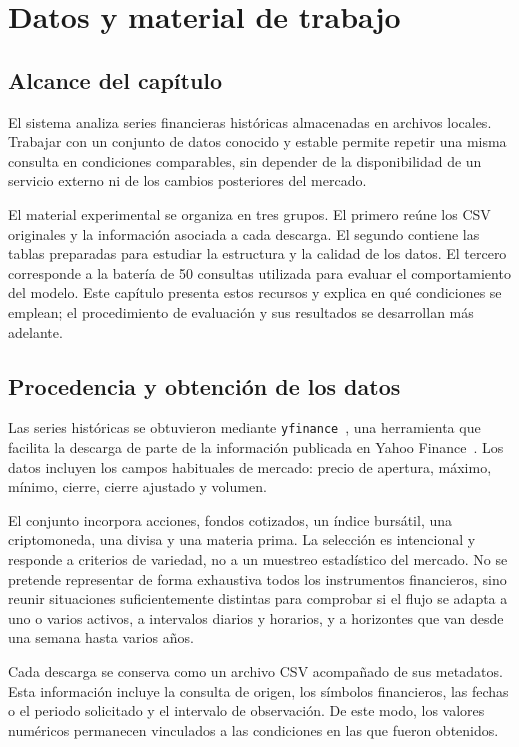 \chapter{Datos y material de trabajo}

\section{Alcance del capítulo}

El sistema analiza series financieras históricas almacenadas en archivos locales. Trabajar con un conjunto de datos conocido y estable permite repetir una misma consulta en condiciones comparables, sin depender de la disponibilidad de un servicio externo ni de los cambios posteriores del mercado.

El material experimental se organiza en tres grupos. El primero reúne los CSV originales y la información asociada a cada descarga. El segundo contiene las tablas preparadas para estudiar la estructura y la calidad de los datos. El tercero corresponde a la batería de 50 consultas utilizada para evaluar el comportamiento del modelo. Este capítulo presenta estos recursos y explica en qué condiciones se emplean; el procedimiento de evaluación y sus resultados se desarrollan más adelante.

\section{Procedencia y obtención de los datos}

Las series históricas se obtuvieron mediante \texttt{yfinance}~\cite{yfinance}, una herramienta que facilita la descarga de parte de la información publicada en Yahoo Finance~\cite{yahoofinancehistorical}. Los datos incluyen los campos habituales de mercado: precio de apertura, máximo, mínimo, cierre, cierre ajustado y volumen.

El conjunto incorpora acciones, fondos cotizados, un índice bursátil, una criptomoneda, una divisa y una materia prima. La selección es intencional y responde a criterios de variedad, no a un muestreo estadístico del mercado. No se pretende representar de forma exhaustiva todos los instrumentos financieros, sino reunir situaciones suficientemente distintas para comprobar si el flujo se adapta a uno o varios activos, a intervalos diarios y horarios, y a horizontes que van desde una semana hasta varios años.

Cada descarga se conserva como un archivo CSV acompañado de sus metadatos. Esta información incluye la consulta de origen, los símbolos financieros, las fechas o el periodo solicitado y el intervalo de observación. De este modo, los valores numéricos permanecen vinculados a las condiciones en las que fueron obtenidos.

